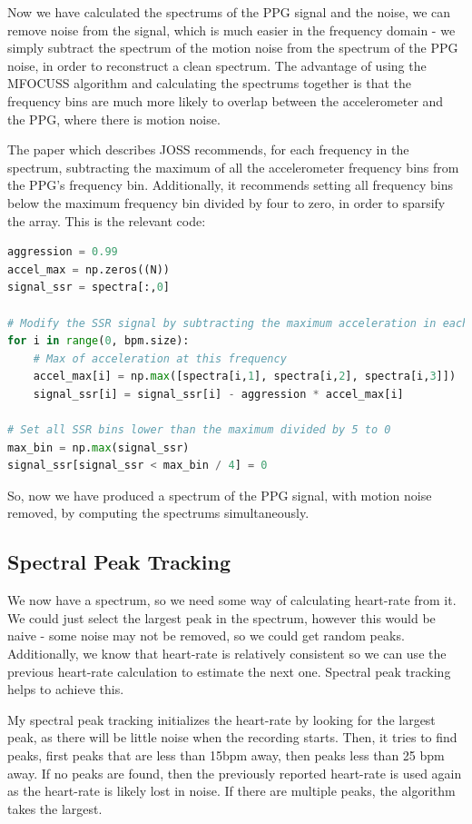 \documentclass[12pt,a4paper,twoside,openany]{report}
\begin{document}
Now we have calculated the spectrums of the PPG signal and the noise, we can
remove noise from the signal, which is much easier in the frequency domain -
we simply subtract the spectrum of the motion noise from the spectrum of the
PPG noise, in order to reconstruct a clean spectrum. The advantage of using
the MFOCUSS algorithm and calculating the spectrums together is that the
frequency bins are much more likely to overlap between the accelerometer and
the PPG, where there is motion noise. 

The paper which describes JOSS \cite{Zhang15.2} recommends, for each frequency in the spectrum,
subtracting the maximum of all the accelerometer frequency bins from the PPG's
frequency bin. Additionally, it recommends setting all frequency bins below 
the maximum frequency bin divided by four to zero, in order to sparsify the array.
This is the relevant code:

\begin{lstlisting}[language=Python]
aggression = 0.99
accel_max = np.zeros((N))
signal_ssr = spectra[:,0]

# Modify the SSR signal by subtracting the maximum acceleration in each bin
for i in range(0, bpm.size):
    # Max of acceleration at this frequency
    accel_max[i] = np.max([spectra[i,1], spectra[i,2], spectra[i,3]])
    signal_ssr[i] = signal_ssr[i] - aggression * accel_max[i]

# Set all SSR bins lower than the maximum divided by 5 to 0
max_bin = np.max(signal_ssr)
signal_ssr[signal_ssr < max_bin / 4] = 0
\end{lstlisting}

So, now we have produced a spectrum of the PPG signal, with motion noise
removed, by computing the spectrums simultaneously.

\subsection{Spectral Peak Tracking}

We now have a spectrum, so we need some way of calculating heart-rate from it.
We could just select the largest peak in the spectrum, however this would be
naive - some noise may not be removed, so we could get random peaks.
Additionally, we know that heart-rate is relatively consistent so we can use
the previous heart-rate calculation to estimate the next one. Spectral peak
tracking helps to achieve this.

My spectral peak tracking initializes the heart-rate by looking for the
largest peak, as there will be little noise when the recording starts. Then,
it tries to find peaks, first peaks that are less than 15bpm away, then peaks
less than 25 bpm away. If no peaks are found, then the previously reported
heart-rate is used again as the heart-rate is likely lost in noise. If there
are multiple peaks, the algorithm takes the largest.
\end{document}
